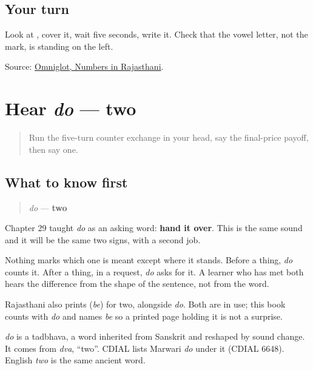 \subsection*{Your turn}
Look at \textbf{}, cover it, wait five seconds, write it. Check that the vowel letter, not the mark, is standing on the left.

\begin{tcolorbox}[breakable,colback=teal!4,colframe=teal!35!black,title={Before you move on}]
Source: \href{https://www.omniglot.com/language/numbers/rajasthani.htm}{Omniglot, Numbers in Rajasthani}.
\end{tcolorbox}
\section[do]{Hear \emph{do} — two}

\label{lesson:MW-C32-hear-do-two}



\begin{quote}
Run the five-turn counter exchange in your head, say the final-price payoff, then say one.
\end{quote}

\subsection*{What to know first}
\begin{quote}
\emph{do} — \textbf{two}
\end{quote}

Chapter 29 taught \emph{do} as an asking word: \textbf{hand it over}. This is the same sound and it will be the same two signs, with a second job.

Nothing marks which one is meant except where it stands. Before a thing, \emph{do} counts it. After a thing, in a request, \emph{do} asks for it. A learner who has met both hears the difference from the shape of the sentence, not from the word.

Rajasthani also prints \textbf{} (\emph{be}) for two, alongside \emph{do}. Both are in use; this book counts with \emph{do} and names \emph{be} so a printed page holding it is not a surprise.

\begin{cousinweb}
\emph{do} is a tadbhava, a word inherited from Sanskrit and reshaped by sound change. It comes from \emph{dva}, \textquotedblleft{}two\textquotedblright{}. CDIAL lists Marwari \emph{do} under it (CDIAL 6648). English \emph{two} is the same ancient word.
\end{cousinweb}

